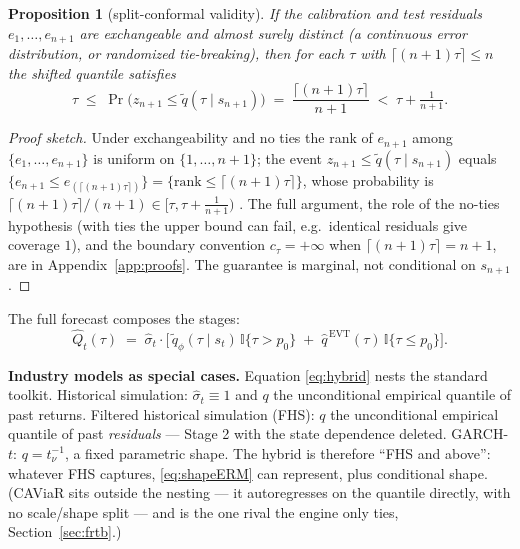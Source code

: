 \documentclass[11pt]{article}
\newtheorem{proposition}{Proposition}
\theoremstyle{remark}
\begin{document}
\begin{proposition}[split-conformal validity]\label{prop:conformal}
If the calibration and test residuals $e_1,\dots,e_{n+1}$ are
exchangeable and almost surely distinct (a continuous error
distribution, or randomized tie-breaking), then for each $\tau$ with
$\lceil(n{+}1)\tau\rceil \le n$ the shifted quantile satisfies
\[
\tau \;\le\; \Pr\big(z_{n+1} \le \widetilde{q}(\tau \mid s_{n+1})\big)
\;=\; \frac{\lceil(n{+}1)\tau\rceil}{n+1}
\;<\; \tau + \tfrac{1}{n+1}.
\]
\end{proposition}
\begin{proof}[Proof sketch]
Under exchangeability and no ties the rank of $e_{n+1}$ among
$\{e_1,\dots,e_{n+1}\}$ is uniform on $\{1,\dots,n+1\}$; the event
$z_{n+1}\le\widetilde{q}(\tau\mid s_{n+1})$ equals $\{e_{n+1}\le
e_{(\lceil(n+1)\tau\rceil)}\}=\{\mathrm{rank}\le\lceil(n{+}1)\tau\rceil\}$,
whose probability is $\lceil(n{+}1)\tau\rceil/(n+1)\in[\tau,\tau+\tfrac1{n+1})$
\citep{vovk2005}. The full argument, the role of the no-ties
hypothesis (with ties the upper bound can fail, e.g.\ identical
residuals give coverage $1$), and the boundary convention
$c_\tau=+\infty$ when $\lceil(n{+}1)\tau\rceil=n+1$, are in
Appendix~\ref{app:proofs}. The guarantee is marginal, not conditional
on $s_{n+1}$.
\end{proof}

The full forecast composes the stages:
\begin{equation}
\widehat{Q}_t(\tau) \;=\; \widehat{\sigma}_t \cdot
\Big[\, \widetilde{q}_\phi(\tau \mid s_t)\,\mathbb{I}\{\tau > p_0\}
\;+\; \widehat{q}^{\,\mathrm{EVT}}(\tau)\,\mathbb{I}\{\tau \le p_0\}
\Big].
\label{eq:hybrid}
\end{equation}

\noindent\textbf{Industry models as special cases.} Equation
\eqref{eq:hybrid} nests the standard toolkit. Historical simulation:
$\widehat{\sigma}_t \equiv 1$ and $q$ the unconditional empirical
quantile of past returns. Filtered historical simulation (FHS): $q$ the
unconditional empirical quantile of past \emph{residuals} --- Stage 2
with the state dependence deleted. GARCH-$t$: $q = t_\nu^{-1}$, a fixed
parametric shape. The hybrid is therefore ``FHS and above'': whatever
FHS captures, \eqref{eq:shapeERM} can represent, plus conditional shape.
(CAViaR sits outside the nesting --- it autoregresses on the quantile
directly, with no scale/shape split --- and is the one rival the engine
only ties, Section~\ref{sec:frtb}.)

\medskip\noindent{}
\end{document}

